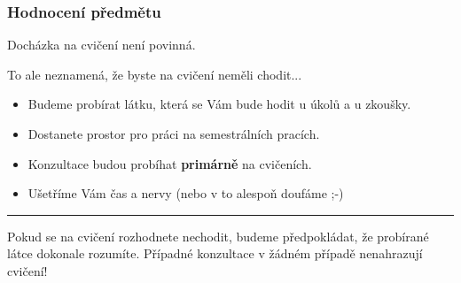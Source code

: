 \documentclass[usenames,dvipsnames,9pt]{beamer}
\begin{document}


\begin{frame}
  \frametitle{Hodnocení předmětu}
  {\Large Docházka na cvičení není povinná.}

  \hfill To ale neznamená, že byste na cvičení neměli chodit...

  \vspace{2em}

  \begin{itemize}
    \item Budeme probírat látku, která se Vám bude hodit u úkolů a u zkoušky.
    \item Dostanete prostor pro práci na semestrálních pracích.
    \item Konzultace budou probíhat \textbf{primárně} na cvičeních.
    \item Ušetříme Vám čas a nervy (nebo v to alespoň doufáme ;-)
  \end{itemize}

  \vfill\hrule
  \small
  \faWarning \hspace{3pt}
  Pokud se na cvičení rozhodnete nechodit, budeme předpokládat, že probírané látce dokonale rozumíte.
  Případné konzultace v žádném případě nenahrazují cvičení!
\end{frame}
\end{document}
